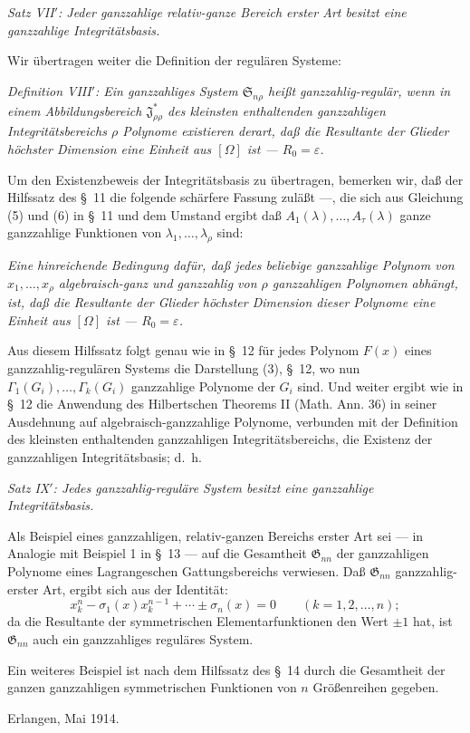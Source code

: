 \documentclass[11pt]{article}
\providecommand{\Ssys}{\mathfrak{S}}
\providecommand{\Jdom}{\mathfrak{J}}
\providecommand{\Gdom}{\mathfrak{G}}
\providecommand{\eps}{\varepsilon}
\begin{document}
\emph{Satz VII$'$: Jeder ganzzahlige relativ-ganze Bereich erster Art besitzt eine ganzzahlige Integritätsbasis.}

Wir übertragen weiter die Definition der regulären Systeme:

\emph{Definition VIII$'$: Ein ganzzahliges System $\Ssys_{n\rho}$ heißt ganzzahlig-regulär, wenn in einem Abbildungsbereich $\Jdom^*_{\rho\rho}$ des kleinsten enthaltenden ganzzahligen Integritätsbereichs $\rho$ Polynome existieren derart, daß die Resultante der Glieder höchster Dimension eine Einheit aus $[\Omega]$ ist --- $R_0=\eps$.}

Um den Existenzbeweis der Integritätsbasis zu übertragen, bemerken wir, daß der Hilfssatz des \S\ 11 die folgende schärfere Fassung zuläßt ---, die sich aus Gleichung (5) und (6) in \S\ 11 und dem Umstand ergibt daß $A_1(\lambda),
\ldots,A_\tau(\lambda)$ ganze ganzzahlige Funktionen von $\lambda_1,
\ldots,
\lambda_\rho$ sind:

\emph{Eine hinreichende Bedingung dafür, daß jedes beliebige ganzzahlige Polynom von $x_1,
\ldots,x_\rho$ algebraisch-ganz und ganzzahlig von $\rho$ ganzzahligen Polynomen abhängt, ist, daß die Resultante der Glieder höchster Dimension dieser Polynome eine Einheit aus $[\Omega]$ ist --- $R_0=\eps$.}

Aus diesem Hilfssatz folgt genau wie in \S\ 12 für jedes Polynom $F(x)$ eines ganzzahlig-regulären Systems die Darstellung (3), \S\ 12, wo nun $\Gamma_1(G_i),
\ldots,
\Gamma_k(G_i)$ ganzzahlige Polynome der $G_i$ sind. Und weiter ergibt wie in \S\ 12 die Anwendung des Hilbertschen Theorems II (Math. Ann. 36) in seiner Ausdehnung auf algebraisch-ganzzahlige Polynome, verbunden mit der Definition des kleinsten enthaltenden ganzzahligen Integritätsbereichs, die Existenz der ganzzahligen Integritätsbasis; d.~h.

\emph{Satz IX$'$: Jedes ganzzahlig-reguläre System besitzt eine ganzzahlige Integritätsbasis.}

Als Beispiel eines ganzzahligen, relativ-ganzen Bereichs erster Art sei --- in Analogie mit Beispiel 1 in \S\ 13 --- auf die Gesamtheit $\Gdom_{nn}$ der ganzzahligen Polynome eines Lagrangeschen Gattungsbereichs verwiesen. Daß $\Gdom_{nn}$ ganzzahlig-erster Art, ergibt sich aus der Identität:
\[
  x_k^n-\sigma_1(x)x_k^{n-1}+\cdots\pm\sigma_n(x)=0
  \qquad(k=1,2,
\ldots,n);
\]
da die Resultante der symmetrischen Elementarfunktionen den Wert $\pm1$ hat, ist $\Gdom_{nn}$ auch ein ganzzahliges reguläres System.

Ein weiteres Beispiel ist nach dem Hilfssatz des \S\ 14 durch die Gesamtheit der ganzen ganzzahligen symmetrischen Funktionen von $n$ Größenreihen gegeben.

Erlangen, Mai 1914.
\end{document}
